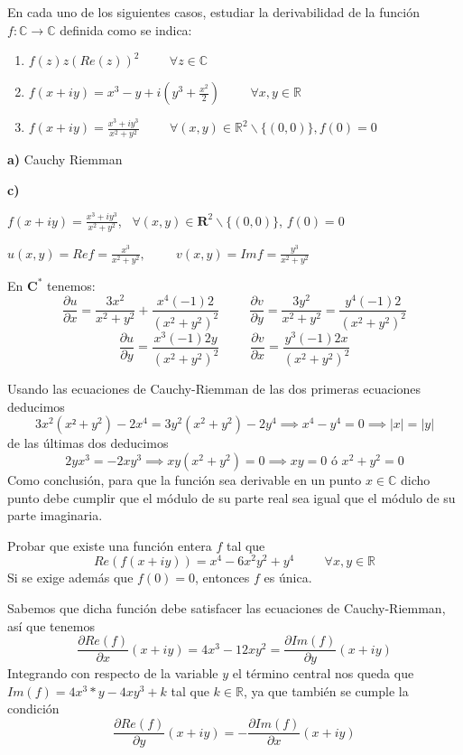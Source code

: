 \begin{ejer}
	En cada uno de los siguientes casos, estudiar la derivabilidad de la función $f:\mathbb{C} \rightarrow\mathbb{C}$ definida como se indica:
	\begin{enumerate}[label=(\alph*)]
		\item $f(z)  z(Re(z))^2 \hspace{1cm}\forall z\in\mathbb{C}$
		\item $f(x+iy) = x^3 -y+i\left( y^3 +\frac{x^2}{2} \right) \hspace{1cm} \forall x,y\in\mathbb{R}$
		\item $f(x+iy) = \frac{x^3+iy^3}{x^2+y^2} \hspace{1cm} \forall (x,y)\in\mathbb{R}^2\backslash\{(0,0)\}, f(0)=0$
	\end{enumerate}	
\end{ejer}

\textbf{a)}
Cauchy Riemman




\textbf{c)}

$f(x+iy) = \frac{x^3+iy^3}{x^2+y^2}$, \ $\forall (x,y)\in\mathbf{R}^2 \backslash \{ (0,0) \}$, $f(0)=0$

$u(x,y) = Re f = \frac{x^3}{x^2+y^2}, \hspace{1cm} v(x,y) = Imf = \frac{y^3}{x^2+y^2}$

En $\mathbf{C}^{\ast}$ tenemos:
$$ \frac{\partial u}{\partial x} = \frac{3x^2}{x^2+y^2} + \frac{x^4(-1)2}{(x^2+y^2)^2} \hspace{1cm}
\frac{\partial v}{\partial y} = \frac{3y^2}{x^2+y^2} = \frac{y^4(-1)2}{(x^2+y^2)^2}$$
$$ \frac{\partial u}{\partial y} = \frac{x^3 (-1)2y}{(x^2+y^2)^2} \hspace{1cm}
\frac{\partial v}{\partial x} = \frac{y^3(-1)2x}{(x^2+y^2)^2}$$

Usando las ecuaciones de Cauchy-Riemman de las dos primeras ecuaciones deducimos
$$3x^2(x²+y^2) - 2x^4 = 3y^2(x^2+y^2)-2y^4 \implies x^4-y^4 = 0 \implies |x|=|y|$$
de las últimas dos deducimos
$$2yx^3=-2xy^3 \implies xy(x^2+y^2) = 0 \implies xy=0 \text{ ó } x^2+y^2=0$$
Como conclusión, para que la función sea derivable en un punto $x\in\mathbb{C}$ dicho punto debe cumplir que el módulo de su parte real sea igual que el módulo de su parte imaginaria.





\begin{ejer}
	Probar que existe una función entera $f$ tal que
	$$Re(f(x+iy)) = x^4-6x^2y^2+y^4 \hspace{1cm}\forall x,y\in\mathbb{R}$$
	Si se exige además que $f(0)=0$, entonces $f$ es única.
\end{ejer}
Sabemos que dicha función debe satisfacer las ecuaciones de Cauchy-Riemman, así que tenemos
$$ \frac{\partial Re(f)}{\partial x}(x+iy) = 4x^3-12xy^2 = \frac{\partial Im(f)}{\partial y}(x+iy) $$
Integrando con respecto de la variable $y$ el término central nos queda que
$Im(f) = 4x^3*y - 4xy^3+k$ tal que $k\in\mathbb{R}$, ya que también se cumple la condición 
$$ \frac{\partial Re(f)}{\partial y} (x+iy) = -\frac{\partial Im(f)}{\partial x} (x+iy) $$

